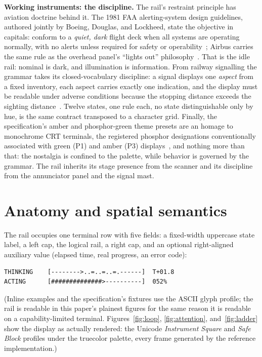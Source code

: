 \documentclass[11pt]{article}
\begin{document}
\textbf{Working instruments: the discipline.} The rail's restraint
principle has aviation doctrine behind it. The 1981 FAA alerting-system
design guidelines, authored jointly by Boeing, Douglas, and Lockheed,
state the objective in capitals: conform to a \emph{quiet, dark} flight
deck when all systems are operating normally, with no alerts unless required for safety or operability~\cite{darkcockpit}; Airbus carries
the same rule as the overhead panel's ``lights out''
philosophy~\cite{airbus1998}. That is the idle rail: nominal is dark,
and illumination is information. From railway signalling the grammar
takes its closed-vocabulary discipline: a signal displays one
\emph{aspect} from a fixed inventory, each aspect carries exactly one
indication, and the display must be readable under adverse conditions
because the stopping distance exceeds the sighting
distance~\cite{pachl}. Twelve states, one rule each, no state
distinguishable only by hue, is the same contract transposed to a
character grid. Finally, the specification's amber and phosphor-green
theme presets are an homage to monochrome CRT terminals, the registered phosphor designations conventionally associated with green (P1) and amber (P3) displays~\cite{phosphor}, and nothing more than that: the nostalgia is confined to the palette, while
behavior is governed by the grammar. The rail inherits its stage
presence from the scanner and its discipline from the annunciator panel
and the signal mast.

\section{Anatomy and spatial semantics}
\label{sec:spatial}

The rail occupies one terminal row with five fields: a fixed-width
uppercase state label, a left cap, the logical rail, a right cap, and an
optional right-aligned auxiliary value (elapsed time, real progress, an
error code):

\begin{lstlisting}
THINKING    [-------->..=..=..=.------]  T+01.8
ACTING      [##############>----------]  052%
\end{lstlisting}

(Inline examples and the specification's fixtures use the ASCII glyph profile; the rail is readable in this paper's plainest figures for the
same reason it is readable on a capability-limited terminal.
Figures~\ref{fig:loop}, \ref{fig:attention}, and~\ref{fig:ladder} show
the display as actually rendered: the Unicode \emph{Instrument Square}
and \emph{Safe Block} profiles under the truecolor palette, every frame
generated by the reference implementation.)
\end{document}
